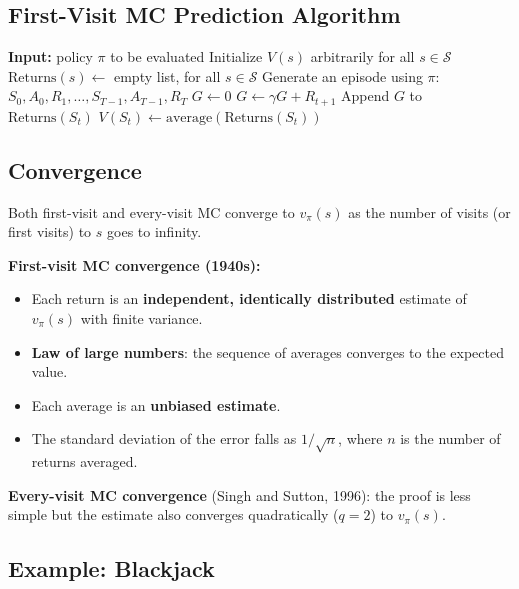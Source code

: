 \documentclass[11pt,a4paper]{article}
\theoremstyle{definition}
\theoremstyle{plain}
\theoremstyle{remark}
\begin{document}
\subsection{First-Visit MC Prediction Algorithm}

\begin{algorithm}
\caption{First-Visit MC Prediction, estimating $V \approx v_\pi$}
\begin{algorithmic}
\STATE \textbf{Input:} policy $\pi$ to be evaluated
\STATE Initialize $V(s)$ arbitrarily for all $s \in \mathcal{S}$
\STATE $\text{Returns}(s) \leftarrow$ empty list, for all $s \in \mathcal{S}$
\LOOP
    \STATE Generate an episode using $\pi$: $S_0, A_0, R_1, \ldots, S_{T-1}, A_{T-1}, R_T$
    \STATE $G \leftarrow 0$
        \STATE $G \leftarrow \gamma G + R_{t+1}$
            \STATE Append $G$ to $\text{Returns}(S_t)$
            \STATE $V(S_t) \leftarrow \text{average}(\text{Returns}(S_t))$
        \ENDIF
    \ENDFOR
\ENDLOOP
\end{algorithmic}
\end{algorithm}

\subsection{Convergence}

Both first-visit and every-visit MC converge to $v_\pi(s)$ as the number of visits (or first visits) to $s$ goes to infinity.

\textbf{First-visit MC convergence (1940s):}
\begin{itemize}
    \item Each return is an \textbf{independent, identically distributed} estimate of $v_\pi(s)$ with finite variance.
    \item \textbf{Law of large numbers}: the sequence of averages converges to the expected value.
    \item Each average is an \textbf{unbiased estimate}.
    \item The standard deviation of the error falls as $1/\sqrt{n}$, where $n$ is the number of returns averaged.
\end{itemize}

\textbf{Every-visit MC convergence} (Singh and Sutton, 1996): the proof is less simple but the estimate also converges quadratically ($q = 2$) to $v_\pi(s)$.

\subsection{Example: Blackjack}
\end{document}
